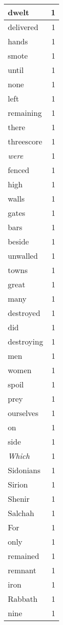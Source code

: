 \begin{center}
\begin{longtable}{l|r}
dwelt & 1 \\ \hline
delivered & 1 \\ \hline
hands & 1 \\ \hline
smote & 1 \\ \hline
until & 1 \\ \hline
none & 1 \\ \hline
left & 1 \\ \hline
remaining & 1 \\ \hline
there & 1 \\ \hline
threescore & 1 \\ \hline
\emph{were} & 1 \\ \hline
fenced & 1 \\ \hline
high & 1 \\ \hline
walls & 1 \\ \hline
gates & 1 \\ \hline
bars & 1 \\ \hline
beside & 1 \\ \hline
unwalled & 1 \\ \hline
towns & 1 \\ \hline
great & 1 \\ \hline
many & 1 \\ \hline
destroyed & 1 \\ \hline
did & 1 \\ \hline
destroying & 1 \\ \hline
men & 1 \\ \hline
women & 1 \\ \hline
spoil & 1 \\ \hline
prey & 1 \\ \hline
ourselves & 1 \\ \hline
on & 1 \\ \hline
side & 1 \\ \hline
\emph{Which} & 1 \\ \hline
Sidonians & 1 \\ \hline
Sirion & 1 \\ \hline
Shenir & 1 \\ \hline
Salchah & 1 \\ \hline
For & 1 \\ \hline
only & 1 \\ \hline
remained & 1 \\ \hline
remnant & 1 \\ \hline
iron & 1 \\ \hline
Rabbath & 1 \\ \hline
nine & 1 \\ \hline

\end{longtable}
\end{center}
